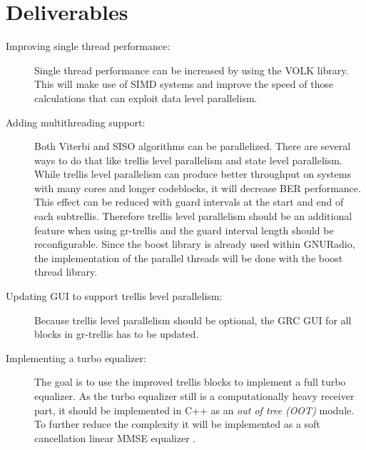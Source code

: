 \documentclass[11pt,		%
	    DIV12,		%
	    a4paper,		%
	    final,		%
	    halfparskip,	%
	    ]{scrartcl}		%
\begin{document}
\section{Deliverables}
\begin{description}
  \item[Improving single thread performance:] Single thread performance can be increased by using the VOLK library. This will make use of SIMD systems and improve the speed of those calculations that can exploit data level          parallelism. 
  \item[Adding multithreading support:] Both Viterbi and SISO algorithms can be parallelized. There are several ways to do that like trellis level parallelism and state level parallelism. While trellis level parallelism can produce  better throughput on systems with many cores and longer codeblocks, it will decrease BER performance. This effect can be reduced with guard intervals at the start and end of each subtrellis. Therefore trellis level parallelism should be an additional feature when using gr-trellis and the guard interval length should be reconfigurable. Since the boost library is already used within GNURadio, the implementation of the parallel threads will be done with the boost thread library.    
  \item[Updating GUI to support trellis level parallelism:] Because trellis level parallelism should be optional, the GRC GUI for all blocks in gr-trellis has to be updated.
  \item[Implementing a turbo equalizer:] The goal is to use the improved trellis blocks to implement a full turbo equalizer. As the turbo equalizer still is a computationally heavy receiver part, it should be implemented in C++ as an \textit{out of tree (OOT)} module. To further reduce the complexity it will be implemented as a soft cancellation linear MMSE equalizer \cite{te02}.    
\end{description}   
\end{document}
